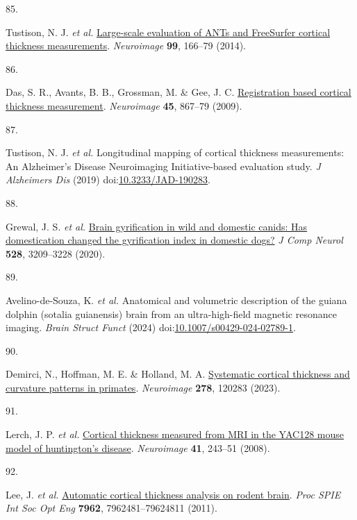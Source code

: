 \documentclass[
  12pt,
]{article}
\newlength{\cslhangindent}
\newlength{\csllabelwidth}
\newenvironment{CSLReferences}[2] %
 {\begin{list}{}{%
  \setlength{\itemindent}{0pt}
  \setlength{\leftmargin}{0pt}
  \setlength{\parsep}{0pt}
  \ifodd #1
   \setlength{\leftmargin}{\cslhangindent}
   \setlength{\itemindent}{-1\cslhangindent}
  \fi
  \setlength{\itemsep}{#2\baselineskip}}}
 {\end{list}}
\newcommand{\CSLLeftMargin}[1]{\parbox[t]{\csllabelwidth}{\strut#1\strut}}
\newcommand{\CSLRightInline}[1]{\parbox[t]{\linewidth - \csllabelwidth}{\strut#1\strut}}
\begin{document}
\begin{CSLReferences}{0}{0}
\CSLLeftMargin{85. }%
\CSLRightInline{Tustison, N. J. \emph{et al.}
\href{https://doi.org/10.1016/j.neuroimage.2014.05.044}{Large-scale
evaluation of {ANTs} and {FreeSurfer} cortical thickness measurements}.
\emph{Neuroimage} \textbf{99}, 166--79 (2014).}

\CSLLeftMargin{86. }%
\CSLRightInline{Das, S. R., Avants, B. B., Grossman, M. \& Gee, J. C.
\href{https://doi.org/10.1016/j.neuroimage.2008.12.016}{Registration
based cortical thickness measurement}. \emph{Neuroimage} \textbf{45},
867--79 (2009).}

\CSLLeftMargin{87. }%
\CSLRightInline{Tustison, N. J. \emph{et al.} Longitudinal mapping of
cortical thickness measurements: An {A}lzheimer's {D}isease
{N}euroimaging {I}nitiative-based evaluation study. \emph{J Alzheimers
Dis} (2019)
doi:\href{https://doi.org/10.3233/JAD-190283}{10.3233/JAD-190283}.}

\CSLLeftMargin{88. }%
\CSLRightInline{Grewal, J. S. \emph{et al.}
\href{https://doi.org/10.1002/cne.24972}{Brain gyrification in wild and
domestic canids: Has domestication changed the gyrification index in
domestic dogs?} \emph{J Comp Neurol} \textbf{528}, 3209--3228 (2020).}

\CSLLeftMargin{89. }%
\CSLRightInline{Avelino-de-Souza, K. \emph{et al.} Anatomical and
volumetric description of the guiana dolphin (sotalia guianensis) brain
from an ultra-high-field magnetic resonance imaging. \emph{Brain Struct
Funct} (2024)
doi:\href{https://doi.org/10.1007/s00429-024-02789-1}{10.1007/s00429-024-02789-1}.}

\CSLLeftMargin{90. }%
\CSLRightInline{Demirci, N., Hoffman, M. E. \& Holland, M. A.
\href{https://doi.org/10.1016/j.neuroimage.2023.120283}{Systematic
cortical thickness and curvature patterns in primates}.
\emph{Neuroimage} \textbf{278}, 120283 (2023).}

\CSLLeftMargin{91. }%
\CSLRightInline{Lerch, J. P. \emph{et al.}
\href{https://doi.org/10.1016/j.neuroimage.2008.02.019}{Cortical
thickness measured from MRI in the YAC128 mouse model of huntington's
disease}. \emph{Neuroimage} \textbf{41}, 243--51 (2008).}

\CSLLeftMargin{92. }%
\CSLRightInline{Lee, J. \emph{et al.}
\href{https://doi.org/10.1117/12.878305}{Automatic cortical thickness
analysis on rodent brain}. \emph{Proc SPIE Int Soc Opt Eng}
\textbf{7962}, 7962481--79624811 (2011).}


\end{CSLReferences}
\end{document}
